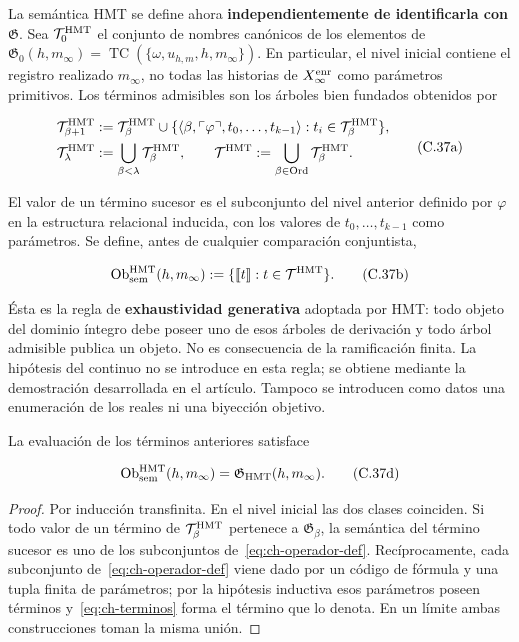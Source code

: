 La semántica HMT se define ahora \textbf{independientemente de identificarla con \(\mathfrak G\)}. Sea \(\mathcal T_0^{\rm HMT}\) el conjunto de nombres
canónicos de los elementos de
\(\mathfrak G_0(h,m_\infty)=
\operatorname{TC}(\{\omega,u_{h,m},h,m_\infty\})\). En particular, el nivel
inicial contiene el registro realizado \(m_\infty\), no todas las historias de
\(X_\infty^{\rm enr}\) como parámetros primitivos.
Los términos admisibles son los árboles bien fundados obtenidos por

\[
 \begin{aligned}
 \mathcal T^{\rm HMT}_{\beta+1}
 &:={\mathcal T}^{\rm HMT}_\beta\cup
 \{\langle\beta,\ulcorner\varphi\urcorner,
       t_0,\ldots,t_{k-1}\rangle:
       t_i\in\mathcal T^{\rm HMT}_\beta\},\\
 \mathcal T^{\rm HMT}_\lambda&:=
       \bigcup_{\beta<\lambda}\mathcal T^{\rm HMT}_\beta,
 \qquad
 \mathcal T^{\rm HMT}:=
       \bigcup_{\beta\in\operatorname{Ord}}\mathcal T^{\rm HMT}_\beta.
 \end{aligned}
\tag{C.37a}\label{eq:ch-terminos}
\]

El valor de un término sucesor es el subconjunto del nivel anterior definido
por \(\varphi\) en la estructura relacional inducida, con los valores de
\(t_0,\ldots,t_{k-1}\) como parámetros. Se define, antes de cualquier
comparación conjuntista,

\[
 \operatorname{Ob}_{\rm sem}^{\rm HMT}(h,m_\infty)
 :=\{\llbracket t\rrbracket:t\in\mathcal T^{\rm HMT}\}.
\tag{C.37b}\label{eq:ch-objetos-semanticos}
\]

Ésta es la regla de \textbf{exhaustividad generativa} adoptada por HMT: todo
objeto del dominio íntegro debe poseer uno de esos árboles de derivación y todo
árbol admisible publica un objeto. No es consecuencia de la ramificación
finita. La hipótesis del continuo no se introduce en esta regla; se obtiene
mediante la demostración desarrollada en el artículo. Tampoco se introducen
como datos una enumeración de los reales ni una biyección objetivo.

\begin{theorem}
\label{thm:ch-6a}
La evaluación de
los términos anteriores satisface

\[
 \operatorname{Ob}_{\rm sem}^{\rm HMT}(h,m_\infty)
 =\mathfrak G_{\rm HMT}(h,m_\infty).
\tag{C.37d}\label{eq:ch-equivalencia-semantica}
\]

\end{theorem}
\begin{proof}
Por inducción transfinita. En el nivel inicial las dos clases
coinciden. Si todo valor de un término de
\(\mathcal T^{\rm HMT}_\beta\) pertenece a
\(\mathfrak G_\beta\), la semántica del término sucesor es uno de los
subconjuntos de~\eqref{eq:ch-operador-def}. Recíprocamente, cada subconjunto de~\eqref{eq:ch-operador-def} viene dado por
un código de fórmula y una tupla finita de parámetros; por la hipótesis
inductiva esos parámetros poseen términos y~\eqref{eq:ch-terminos} forma el término que lo
denota. En un límite ambas construcciones toman la misma unión.
\end{proof}

